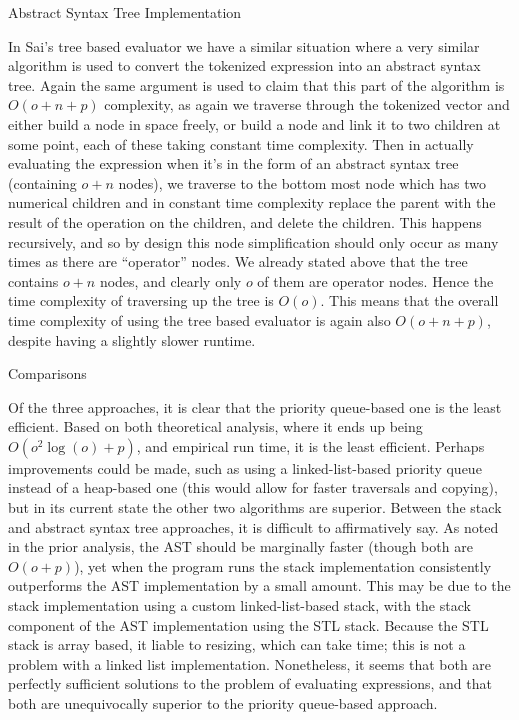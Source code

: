 \documentclass[11pt]{article}
\begin{document}
\centerline{Abstract Syntax Tree Implementation}
In Sai's tree based evaluator we have a similar situation where a very similar algorithm is used to convert the tokenized expression into an abstract syntax tree.
Again the same argument is used to claim that this part of the algorithm is $O(o+n+p)$ complexity, as again we traverse through the tokenized vector and either build a node in space freely, or build a node and link it to two children at some point, each of these taking constant time complexity.
Then in actually evaluating the expression when it's in the form of an abstract syntax tree (containing $o+n$ nodes), we traverse to the bottom most node which has two numerical children and in constant time complexity replace the parent with the result of the operation on the children, and delete the children.
This happens recursively, and so by design this node simplification should only occur as many times as there are ``operator'' nodes. We already stated above that the tree contains $o+n$ nodes, and clearly only $o$ of them are operator nodes. Hence the time complexity of traversing up the tree is $O(o)$. This means that the overall time complexity of using the tree based evaluator is again also $O(o+n+p)$, despite having a slightly slower runtime.

\centerline{Comparisons}
Of the three approaches, it is clear that the priority queue-based one is the least efficient.
Based on both theoretical analysis, where it ends up being $O(o^2\log(o)+p)$, and empirical run time, it is the least efficient.
Perhaps improvements could be made, such as using a linked-list-based priority queue instead of a heap-based one (this would allow for faster traversals and copying), but in its current state the other two algorithms are superior.
Between the stack and abstract syntax tree approaches, it is difficult to affirmatively say.
As noted in the prior analysis, the AST should be marginally faster (though both are $O(o + p)$), yet when the program runs the stack implementation consistently outperforms the AST implementation by a small amount.
This may be due to the stack implementation using a custom linked-list-based stack, with the stack component of the AST implementation using the STL stack.
Because the STL stack is array based, it liable to resizing, which can take time; this is not a problem with a linked list implementation.
Nonetheless, it seems that both are perfectly sufficient solutions to the problem of evaluating expressions, and that both are unequivocally superior to the priority queue-based approach.
\end{document}
